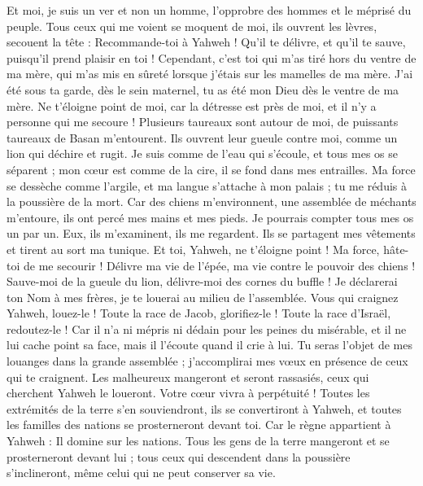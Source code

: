 \begin{multicols}{2}
Et moi, je suis un ver et non un homme, l'opprobre des hommes et le méprisé du peuple.
Tous ceux qui me voient se moquent de moi, ils ouvrent les lèvres, secouent la tête :
Recommande-toi à Yahweh ! Qu'il te délivre, et qu'il te sauve, puisqu'il prend plaisir en toi !
Cependant, c'est toi qui m'as tiré hors du ventre de ma mère, qui m'as mis en sûreté lorsque j'étais sur les mamelles de ma mère.
J'ai été sous ta garde, dès le sein maternel, tu as été mon Dieu dès le ventre de ma mère.
Ne t'éloigne point de moi, car la détresse est près de moi, et il n'y a personne qui me secoure !
Plusieurs taureaux sont autour de moi, de puissants taureaux de Basan m'entourent.
Ils ouvrent leur gueule contre moi, comme un lion qui déchire et rugit.
Je suis comme de l'eau qui s'écoule, et tous mes os se séparent ; mon cœur est comme de la cire, il se fond dans mes entrailles.
Ma force se dessèche comme l'argile, et ma langue s'attache à mon palais ; tu me réduis à la poussière de la mort.
Car des chiens m'environnent, une assemblée de méchants m'entoure, ils ont percé mes mains et mes pieds.
Je pourrais compter tous mes os un par un. Eux, ils m'examinent, ils me regardent.
Ils se partagent mes vêtements et tirent au sort ma tunique.
Et toi, Yahweh, ne t'éloigne point ! Ma force, hâte-toi de me secourir !
Délivre ma vie de l'épée, ma vie contre le pouvoir des chiens !
Sauve-moi de la gueule du lion, délivre-moi des cornes du buffle !
Je déclarerai ton Nom à mes frères, je te louerai au milieu de l'assemblée.
Vous qui craignez Yahweh, louez-le ! Toute la race de Jacob, glorifiez-le ! Toute la race d'Israël, redoutez-le !
Car il n'a ni mépris ni dédain pour les peines du misérable, et il ne lui cache point sa face, mais il l'écoute quand il crie à lui.
Tu seras l'objet de mes louanges dans la grande assemblée ; j'accomplirai mes vœux en présence de ceux qui te craignent.
Les malheureux mangeront et seront rassasiés, ceux qui cherchent Yahweh le loueront. Votre cœur vivra à perpétuité !
Toutes les extrémités de la terre s'en souviendront, ils se convertiront à Yahweh, et toutes les familles des nations se prosterneront devant toi.
Car le règne appartient à Yahweh : Il domine sur les nations.
Tous les gens de la terre mangeront et se prosterneront devant lui ; tous ceux qui descendent dans la poussière s'inclineront, même celui qui ne peut conserver sa vie.

\end{multicols}
